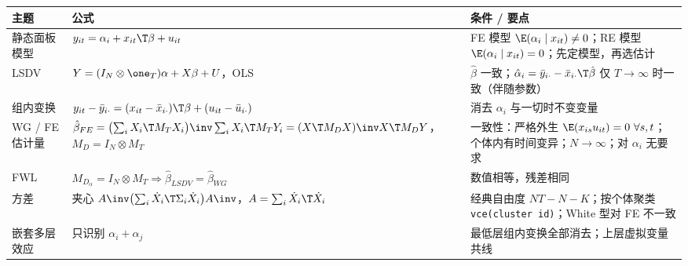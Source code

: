 \begin{center}
\small
\begin{tabularx}{\linewidth}{@{}p{2.3cm}LL@{}}
\toprule
主题 & 公式 & 条件 / 要点\\
\midrule
静态面板模型 & $y_{it}=\alpha_i+x_{it}\T\beta+u_{it}$ & FE 模型 $\E(\alpha_i\mid x_{it})\neq0$；RE 模型 $\E(\alpha_i\mid x_{it})=0$；先定模型，再选估计\\
LSDV & $Y=(I_N\otimes\one_T)\alpha+X\beta+U$，OLS & $\hat\beta$ 一致；$\hat\alpha_i=\bar y_{i\cdot}-\bar x_{i\cdot}\T\hat\beta$ 仅 $T\to\infty$ 时一致（伴随参数）\\
组内变换 & $y_{it}-\bar y_{i\cdot}=(x_{it}-\bar x_{i\cdot})\T\beta+(u_{it}-\bar u_{i\cdot})$ & 消去 $\alpha_i$ 与一切时不变变量\\
WG / FE 估计量 & $\hat\beta_{FE}=\bigl(\sum_iX_i\T M_TX_i\bigr)\inv\sum_iX_i\T M_TY_i=(X\T M_DX)\inv X\T M_DY$，$M_D=I_N\otimes M_T$ & 一致性：严格外生 $\E(x_{is}u_{it})=0\ \forall s,t$；个体内有时间变异；$N\to\infty$；对 $\alpha_i$ 无要求\\
FWL & $M_{D_\alpha}=I_N\otimes M_T\Rightarrow\hat\beta_{LSDV}=\hat\beta_{WG}$ & 数值相等，残差相同\\
方差 & 夹心 $A\inv\bigl(\sum_i\dot X_i\T\Sigma_i\dot X_i\bigr)A\inv$，$A=\sum_i\dot X_i\T\dot X_i$ & 经典自由度 $NT-N-K$；按个体聚类 \texttt{vce(cluster id)}；White 型对 FE 不一致\\
嵌套多层效应 & 只识别 $\alpha_i+\alpha_j$ & 最低层组内变换全部消去；上层虚拟变量共线\\
\bottomrule
\end{tabularx}
\end{center}

